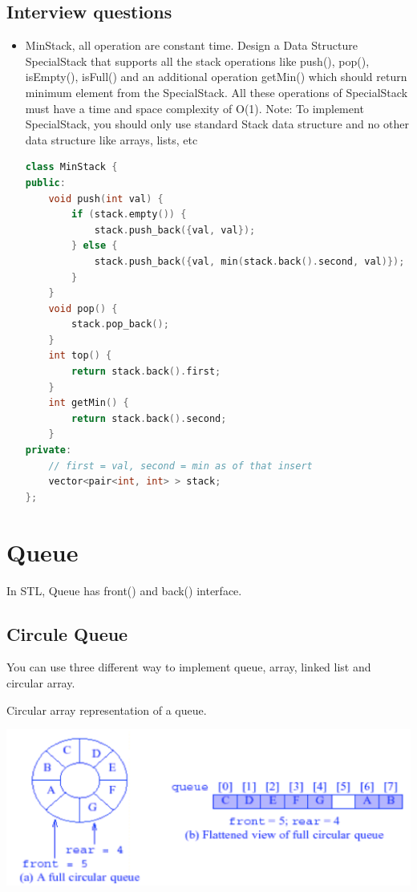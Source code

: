 \documentclass[a4paper,11pt,twoside]{book}
\begin{document}
\subsection{Interview questions}
\begin{itemize}

\item MinStack, all operation are constant time. Design a Data Structure SpecialStack that supports all the stack operations like push(), pop(), isEmpty(), isFull() and an additional operation getMin() which should return minimum element from the SpecialStack. All these operations of SpecialStack must have a time and space complexity of O(1). 
Note: To implement SpecialStack, you should only use standard Stack data structure and no other data structure like arrays, lists, etc 
\begin{lstlisting}[frame=single, language=c++, basicstyle=\scriptsize]
class MinStack {
public:
	void push(int val) {
		if (stack.empty()) {
			stack.push_back({val, val});
		} else {
			stack.push_back({val, min(stack.back().second, val)});
		}
	}
	void pop() {
		stack.pop_back();
	}
	int top() {
		return stack.back().first;
	}	
	int getMin() {
		return stack.back().second;
	}
private:
	// first = val, second = min as of that insert
	vector<pair<int, int> > stack;
};	
\end{lstlisting}

\end{itemize}

\section{Queue}

	\par In STL, Queue has front() and back() interface. 


\subsection{Circule Queue}

	
\par You can use three different way to implement queue, array, linked list and circular array.
	
\par Circular array representation of a queue. 

\begin{center}
	\includegraphics[scale=0.35]{pics/cd.png} 
\end{center}
\end{document}
